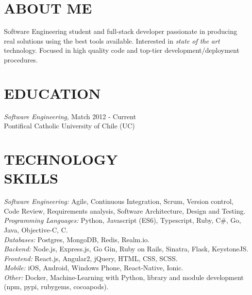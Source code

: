 \documentclass[margin, 10pt]{res} %
\begin{document}
\begin{resume}


\section{ABOUT ME}

Software Engineering student and full-stack developer passionate in producing real solutions using the best tools available.
Interested in \textit{state of the art} technology.
Focused in high quality code and top-tier development/deployment procedures.


\section{EDUCATION}

{\sl Software Engineering,}  \hfill Match 2012 - Current \\
Pontifical Catholic University of Chile (UC)\\


\section{TECHNOLOGY \\ SKILLS}

{\sl Software Engineering:} Agile, Continuous Integration, Scrum, Version control, Code Review, Requirements analysis, Software Architecture, Design and Testing. \\
{\sl Programming Languages:}  Python, Javascript (ES6), Typescript, Ruby, C\#, Go, Java, Objective-C, C. \\
{\sl Databases:} Postgres, MongoDB, Redis, Realm.io. \\
{\sl Backend:} Node.js, Express.js, Go Gin, Ruby on Rails, Sinatra, Flask, KeystoneJS. \\
{\sl Frontend:} React.js, Angular2, jQuery, HTML, CSS, SCSS. \\
{\sl Mobile:} iOS, Android, Windows Phone, React-Native, Ionic. \\
{\sl Other:} Docker, Machine-Learning with Python, library and module development (npm, pypi, rubygems, cocoapods). \\


\end{resume}
\end{document}
